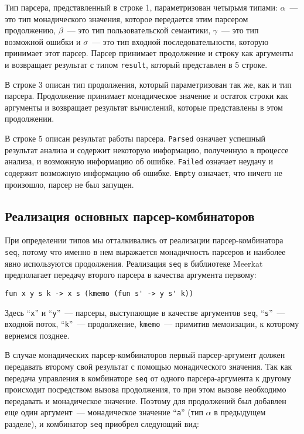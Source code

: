 Тип парсера, представленный в строке 1, параметризован четырьмя типами: $\alpha$~--- это тип монадического значения, которое передается этим парсером продолжению, $\beta$~--- это тип пользовательской семантики, $\gamma$~--- это тип возможной ошибки и $\sigma$~--- это тип входной последовательности, которую принимает этот парсер. Парсер принимает продолжение и строку как аргументы и возвращает результат с типом \lstinline|result|, который представлен в 5 строке.

В строке 3 описан тип продолжения, который параметризован так же, как и тип парсера. Продолжение принимает монадическое значение и остаток строки как аргументы и возвращает результат вычислений, которые представлены в этом продолжении.

В строке 5 описан результат работы парсера. \lstinline|Parsed| означает успешный результат анализа и содержит некоторую информацию, полученную в процессе
анализа, и возможную информацию об ошибке. \lstinline|Failed| означает неудачу и содержит возможную информацию об ошибке. \lstinline|Empty| означает, что ничего не произошло, парсер не был запущен.

\subsection{Реализация основных парсер-комбинаторов}

При определении типов мы отталкивались от реализации парсер-комбинатора \lstinline|seq|, потому что именно в нем выражается монадичность парсеров и наиболее явно используются продолжения. Реализация \lstinline|seq| в библиотеке Meerkat предполагает передачу второго парсера в качества аргумента первому:

\begin{lstlisting}[basicstyle=\small, numbers=none]
   fun x y s k -> x s (kmemo (fun s' -> y s' k))
\end{lstlisting}

Здесь ``\lstinline|x|'' и ``\lstinline|y|''~--- парсеры, выступающие в качестве аргументов \lstinline|seq|, ``\lstinline|s|''~--- входной поток, ``\lstinline|k|''~--- продолжение, \lstinline|kmemo|~--- примитив мемоизации, к которому вернемся позднее.

В случае монадических парсер-комбинаторов первый парсер-аргумент должен передавать второму свой результат с помощью монадического значения. Так как передача управления в комбинаторе \lstinline|seq| от одного парсера-аргумента к другому происходит посредством вызова продолжения, то при этом вызове необходимо передавать и монадическое значение. Поэтому для продолжений был добавлен еще один аргумент~--- монадическое значение ``\lstinline|a|'' (тип $\alpha$ в предыдущем разделе), и комбинатор \lstinline|seq| приобрел следующий вид:

